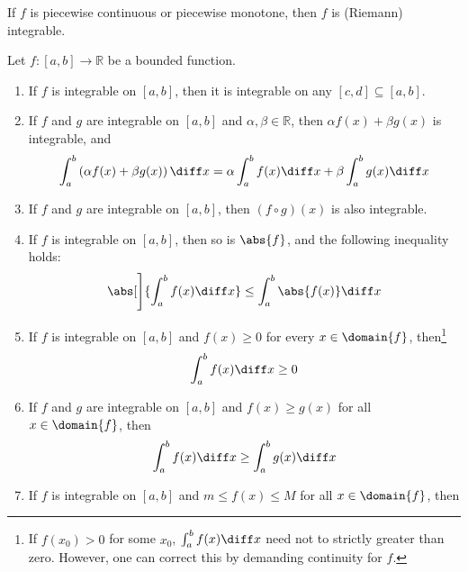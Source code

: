 \begin{thm}\label{thm-continuous-monotone-integrable}
	If $f$ is piecewise continuous or piecewise monotone, then $f$ is (Riemann)
	integrable.
\end{thm}

\begin{thm}\label{thm-definite-integral-theorems}
	Let $f:[a,b]\to\mathbb{R}$ be a bounded function.
	\begin{enumerate}
		\item If $f$ is integrable on $[a,b]$, then it is integrable on any $[c,d]\subseteq[a,b]$.
		\item If $f$ and $g$ are integrable on $[a,b]$ and $\alpha,\beta\in\mathbb{R}$, then $\alpha f(x)+ \beta g(x)$ is integrable, and
		      \begin{equation}\label{eq-definite-integral-linearity}
			      \int_a^b \left(\alpha f(x)+ \beta g(x)\right) \diff x = \alpha \int_a^b f(x) \diff x + \beta \int_a^b g(x) \diff x
		      \end{equation}
		\item If $f$ and $g$ are integrable on $[a,b]$, then $(f \circ g)(x)$ is also integrable.
		\item If $f$ is integrable on $[a,b]$, then so is $\abs{f}$, and the following inequality holds:
		      \begin{equation}\label{eq-definite-integral-triangle-inequality}
			      \abs[\Bigg]{\int_a^b f(x) \diff x} \leq \int_a^b \abs{f(x)} \diff x
		      \end{equation}
		\item If $f$ is integrable on $[a,b]$ and $f(x)\geq0$ for every $x\in\domain{f}$, then\footnote{If $f(x_0)>0$ for some $x_0$,
			      $\int_a^b f(x) \diff x$ need not to strictly greater than zero. However, one can correct this by demanding continuity for $f$.}
		      \begin{equation}\label{eq-definite-integral-positvity}
			      \int_a^b f(x) \diff x \geq 0
		      \end{equation}
		\item If $f$ and $g$ are integrable on $[a,b]$ and $f(x)\geq g(x)$ for all $x\in\domain{f}$, then
		      \begin{equation}\label{eq-definite-integral-monotonicity}
			      \int_a^b f(x) \diff x \geq \int_a^b g(x) \diff x
		      \end{equation}
		\item If $f$ is integrable on $[a,b]$ and $m \leq f(x) \leq M$ for all $x\in\domain{f}$, then

\end{enumerate}
\end{thm}
